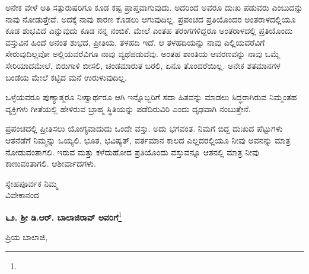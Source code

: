 ಅನೇಕ ವೇಳೆ ಅತಿ ಸತ್ಪುರುಷರಿಗೂ ಕೂಡ ಕಷ್ಟ ಪ್ರಾಪ್ತವಾಗುವುದು. ಅದರಿಂದ ಅವರೂ ದುಃಖ ಪಡುವರು ಎಂಬುದನ್ನು ನಾವು ನೋಡುತ್ತೇವೆ. ಅದಕ್ಕೆ ನಾವು ಕಾರಣ ಕೊಡಲು ಆಗುವುದಿಲ್ಲ. ಪ್ರಪಂಚದ ಪ್ರತಿಯೊಂದರ ಅಂತರಾಳದಲ್ಲಿಯೂ ಕೂಡ ಶುಭವಿದೆ ಎನ್ನುವುದು ಕೂಡ ನನ್ನ ನಂಬಿಕೆ. ಮೇಲೆ ಎಂತಹ ತರಂಗಗಳಿದ್ದರೂ ಅಂತರಾಳದಲ್ಲಿ ಪ್ರತಿಯೊಂದು ವಸ್ತುವಿನ ಹಿಂದೆ ಅನಂತ ಶುಭದ, ಪ್ರೀತಿಯ, ತಳಹದಿ ಇದೆ. ಆ ತಳಹದಿಯನ್ನು ನಾವು ಎಲ್ಲಿಯವರೆವಿಗೆ ಸೇರುವುದಿಲ್ಲವೋ ಅಲ್ಲಿಯವರೆವಿಗೂ ನಾವು ವ್ಯಥೆಪಡುವೆವು. ಅಂತಹ ಶಾಂತಿಯ ಆವರಣವನ್ನು ನಾವು ಒಮ್ಮೆ ಸೇರಿಯಾದಮೇಲೆ, ಬಿರುಗಾಳಿ ಬೀಸಲಿ, ಚಂಡಮಾರುತ ಬರಲಿ, ಏನೂ ತೊಂದರೆಯಿಲ್ಲ. ಅನೇಕ ಶತಮಾನಗಳ ಬಂಡೆಯ ಮೇಲೆ ಕಟ್ಟಿದ ಮನೆ ಉರುಳುವುದಿಲ್ಲ.

ಒಳ್ಳೆಯವರೂ ಪುಣ್ಯಾತ್ಮರೂ ನಿಃಸ್ವಾರ್ಥರೂ ಆಗಿ ಇನ್ನೊಬ್ಬರಿಗೆ ಸದಾ ಹಿತವನ್ನು ಮಾಡಲು ಸಿದ್ಧರಾಗಿರುವ ನಿಮ್ಮಂತಹ ವ್ಯಕ್ತಿಗಳು ಗೀತೆಯಲ್ಲಿ ಹೇಳಿರುವ ಬ್ರಾಹ್ಮ ಸ್ಥಿತಿಯನ್ನು ಪಡೆದಿರುವಿರಿ ಎಂದು ದೃಢವಾಗಿ ನಂಬುತ್ತೇನೆ.

ಪ್ರಪಂಚದಲ್ಲಿ ಪ್ರೀತಿಸಲು ಯೋಗ್ಯವಾದುದು ಒಂದೇ ವಸ್ತು. ಅದು ಭಗವಂತ. ನಿಮಗೆ ಬಿದ್ದ ದುಃಖದ ಪೆಟ್ಟುಗಳು ಆತನೆಡೆಗೆ ನಿಮ್ಮನ್ನು ಒಯ್ಯಲಿ. ಭೂತ, ಭವಿಷ್ಯತ್, ವರ್ತಮಾನ ಕಾಲದ ಎಲ್ಲದರಲ್ಲಿಯೂ ನೀವು ಅವನನ್ನು ಮಾತ್ರ ನೋಡುವಂತಾಗಲಿ. ಇರುವ ಮತ್ತು ಕಳೆದುಹೋದ ಪ್ರತಿಯೊಂದು ವಸ್ತುವನ್ನೂ ಆತನಲ್ಲಿ ಮಾತ್ರ ನೀವು ಕಾಣುವಂತಾಗಲಿ. ಆಶೀರ್ವಾದಗಳು.

{\flushright
ಸ್ನೇಹಪೂರ್ವಕ ನಿಮ್ಮ\\ವಿವೇಕಾನಂದ\par}

\newpage

\begin{center}
\textbf{೬೨. ಶ‍್ರೀ ಡಿ.ಆರ್. ಬಾಲಾಜಿರಾವ್ ಅವರಿಗೆ}\footnote{}\\ 
{\fontsize{12.5}{11}\selectfont{
(ಸಂಸಾರದಲ್ಲಿ ದೊಡ್ಡದೊಂದು ಸಂಕಟ ಪ್ರಾಪ್ತವಾಗಿ ಶೋಕಾರ್ತರಾದ ಮದ್ರಾಸಿನ ಗೆಳೆಯರೊಬ್ಬರಿಗೆ ಬೊಂಬಾಯಿಂದ ೨೩ನೇ ಮೇ, ೧೮೯೩ರಲ್ಲಿ ಬರೆದ ಪತ್ರ)}}
\end{center}
\vspace{-0.3cm}

ಪ್ರಿಯ ಬಾಲಾಜಿ,

